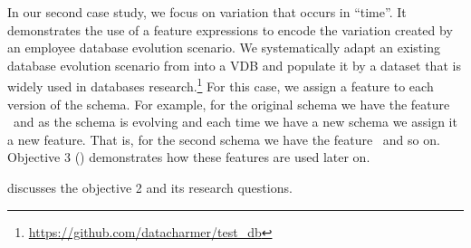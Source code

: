 In our second case study, we focus on variation that occurs in ``time''.
It demonstrates the use of a feature expressions to encode the variation created by
 an employee database evolution
scenario. We systematically adapt an existing database evolution scenario from
\citet{prima08Moon} into a VDB and populate it by a dataset that is widely used
in databases research.\footnote{\url{https://github.com/datacharmer/test_db}}
%
For this case, we assign a feature to each version of the schema.
For example, for the original schema we have the feature \vOne\ and
as the schema is evolving and each time we have a new schema we 
assign it a new feature. That is, for the second schema we have the 
feature \vTwo\ and so on. 
%
Objective 3 () demonstrates how these features are used later on.

 discusses the objective 2 and its research questions.




